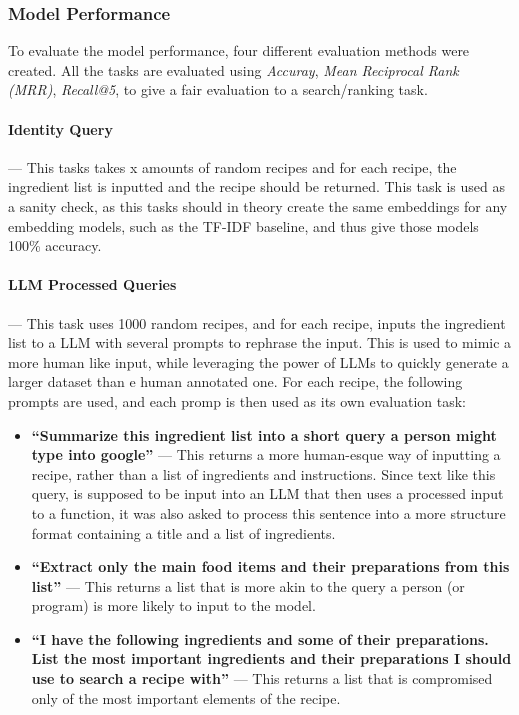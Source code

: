 \documentclass[11pt]{article}
\begin{document}
\subsubsection{Model Performance}\label{sec:modelperfomance}
To evaluate the model performance, four different evaluation methods were
created.
All the tasks are evaluated using \emph{Accuray},
\emph{Mean Reciprocal Rank (MRR)}, \emph{Recall@5}, to give a fair evaluation to
a search/ranking task.

\paragraph{Identity Query} --- This tasks takes x amounts of random recipes
and for each recipe, the ingredient list is inputted and the recipe should be
returned.
This task is used as a sanity check, as this tasks should in theory create the
same embeddings for any embedding models, such as the TF-IDF baseline, and thus
give those models 100\% accuracy.

\paragraph{LLM Processed Queries} --- This task uses 1000 random
recipes, and for each recipe, inputs the ingredient list to a LLM with several
prompts to rephrase the input.
This is used to mimic a more human like input, while leveraging the power of
LLMs to quickly generate a larger dataset than e human annotated one.
For each recipe, the following prompts are used, and each promp is then used as
its own evaluation task:
\begin{itemize}
    \item \textbf{``Summarize this ingredient list into a short query a person might type
        into google''} --- This returns a more human-esque way of inputting a
        recipe, rather than a list of ingredients and instructions.
        Since text like this query, is supposed to be input into an LLM that
        then uses a processed input to a function, it was also asked to process
        this sentence into a more structure format containing a title and a list
        of ingredients.
    \item \textbf{``Extract only the main food items and their preparations from
        this list''} --- This returns a list that is more akin to the query a
        person (or program) is more likely to input to the model.
    \item \textbf{``I have the following ingredients and some of their
            preparations. List the most important ingredients and their
        preparations I should use to search a recipe with''} --- This returns a
        list that is compromised only of the most important elements of the
        recipe.
\end{itemize}
\end{document}
